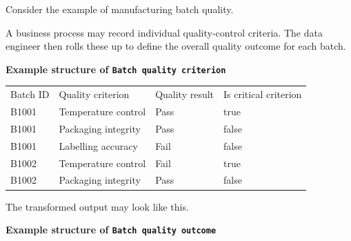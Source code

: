 \documentclass[10pt,openany,10pt]{book}
\newcounter{none}
\let\podeToprule\toprule
\let\podeMidrule\midrule
\let\podeBottomrule\bottomrule
\renewcommand{\toprule}{\arrayrulecolor{pbiGrid}\podeToprule}
\renewcommand{\midrule}{\arrayrulecolor{pbiGrid}\podeMidrule}
\renewcommand{\bottomrule}{\arrayrulecolor{pbiGrid}\podeBottomrule}
\begin{document}
Consider the example of manufacturing batch quality.

A business process may record individual quality-control criteria. The
data engineer then rolls these up to define the overall quality outcome
for each batch.

\textbf{Example structure of
\texttt{\textquotesingle{}Batch\ quality\ criterion\textquotesingle{}}}

{\def\LTcaptype{none} %
\begin{longtable}[]{@{}
  >{\raggedright\arraybackslash}p{}
  >{\raggedright\arraybackslash}p{}
  >{\raggedright\arraybackslash}p{}
  >{\raggedright\arraybackslash}p{}@{}}
\toprule\noalign{}
\begin{minipage}[b]{\linewidth}\raggedright
Batch ID
\end{minipage} & \begin{minipage}[b]{\linewidth}\raggedright
Quality criterion
\end{minipage} & \begin{minipage}[b]{\linewidth}\raggedright
Quality result
\end{minipage} & \begin{minipage}[b]{\linewidth}\raggedright
Is critical criterion
\end{minipage} \\
\midrule\noalign{}
\endhead
\bottomrule\noalign{}
\endlastfoot
B1001 & Temperature control & Pass & true \\
B1001 & Packaging integrity & Pass & false \\
B1001 & Labelling accuracy & Fail & false \\
B1002 & Temperature control & Fail & true \\
B1002 & Packaging integrity & Pass & false \\
\end{longtable}
}

The transformed output may look like this.

\textbf{Example structure of
\texttt{\textquotesingle{}Batch\ quality\ outcome\textquotesingle{}}}
\end{document}
